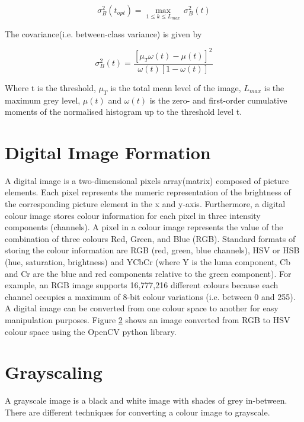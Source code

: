 \begin{equation} \label{eu_eqn}
\sigma_{B}^{2}(t_{opt}) = \max_{1 \leq k \leq L_{max}} \, \sigma_{B}^{2}(t)
\end{equation}

 The covariance(i.e. between-class variance) is given by 

\begin{equation} \label{e_eqn}
\sigma_{B}^{2}(t) = \frac{{\left[ \mu_T \omega (t) - \mu (t) \right]}^2}{\omega(t) \left[ {1 - \omega(t)} \right] }
\end{equation}


Where t is the threshold, $\mu_T$ is the total mean level of the image, $L_{max}$ is the maximum grey level, $\mu (t)$ and $\omega (t)$ is the zero- and first-order cumulative moments of the normalised histogram up to the threshold level t.


\section{Digital Image Formation}
A digital image is a two-dimensional pixels array(matrix) composed of picture elements. Each pixel represents the numeric representation of the brightness of the corresponding picture element in the x and y-axis. Furthermore, a digital colour image stores colour information for each pixel in three intensity components (channels).  A pixel in a colour image represents the value of the combination of three colours Red, Green, and Blue (RGB). Standard formats of storing the colour information are RGB (red, green, blue channels), HSV or HSB (hue, saturation, brightness) and YCbCr (where Y is the luma component, Cb and Cr are the blue and red components relative to the green component). For example, an RGB image supports 16,777,216 different colours because each channel occupies a maximum of 8-bit colour variations (i.e. between 0 and 255). A digital image can be converted from one colour space to another for easy manipulation purposes. Figure \ref{} shows an image converted from RGB to HSV colour space using the OpenCV python library.

\section{Grayscaling}
A grayscale image is a black and white image with shades of grey in-between. There are different techniques for converting a colour image to grayscale. 

